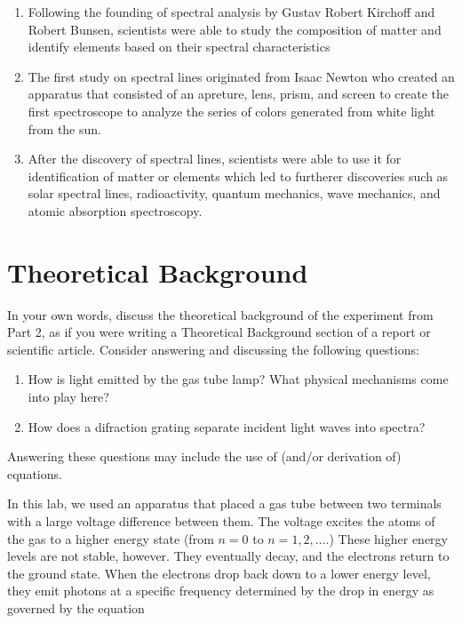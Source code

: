 \documentclass{article}
\begin{document}
\begin{enumerate}
    \item Following the founding of spectral analysis by Gustav Robert Kirchoff and Robert Bunsen, scientists were able to study the composition of matter and identify elements based on their spectral characteristics
    \item The first study on spectral lines originated from Isaac Newton who created an apparatus that consisted of an apreture, lens, prism, and screen to create the first spectroscope to analyze the series of colors generated from white light from the sun.
    \item After the discovery of spectral lines, scientists were able to use it for identification of matter or elements which led to furtherer discoveries such as solar spectral lines, radioactivity, quantum mechanics, wave mechanics, and atomic absorption spectroscopy.
\end{enumerate}


\pagebreak
\section{Theoretical Background}

In your own words, discuss the theoretical background of the experiment from Part 2, as if
you were writing a Theoretical Background section of a report or scientific article.
Consider answering and discussing the following questions:
\begin{enumerate}[label=(\alph*)]
\item How is light emitted by the gas tube lamp? What physical mechanisms come into play
here?
\item How does a difraction grating separate incident light waves into spectra?
\end{enumerate}

Answering these questions may include the use of (and/or derivation of) equations.


In this lab, we used an apparatus that placed a gas tube between two terminals with a large voltage difference between them. The voltage excites the atoms of the gas to a higher energy state (from $n = 0$ to $n = 1, 2, \dots$.) These higher energy levels are not stable, however. They eventually decay, and the electrons return to the ground state. When the electrons drop back down to a lower energy level, they emit photons at a specific frequency determined by the drop in energy as governed by the equation
\end{document}
